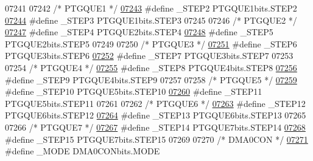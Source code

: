 \begin{DoxyCode}
07241 
07242 \textcolor{comment}{/* PTGQUE1 */}
\hypertarget{a00015_source_l07243}{}\hyperlink{a00015_ab7a038de94f59ad711958205c6e9a802}{07243} \textcolor{preprocessor}{#define \_STEP2 PTGQUE1bits.STEP2}
\hypertarget{a00015_source_l07244}{}\hyperlink{a00015_aa905cce9d90af5accde9b581065fcd9b}{07244} \textcolor{preprocessor}{#define \_STEP3 PTGQUE1bits.STEP3}
07245 
07246 \textcolor{comment}{/* PTGQUE2 */}
\hypertarget{a00015_source_l07247}{}\hyperlink{a00015_acb9583d0b0ccc8b7f1cb05f77205b915}{07247} \textcolor{preprocessor}{#define \_STEP4 PTGQUE2bits.STEP4}
\hypertarget{a00015_source_l07248}{}\hyperlink{a00015_a0d9d2c77a3255e72af295a4bf2dd64ba}{07248} \textcolor{preprocessor}{#define \_STEP5 PTGQUE2bits.STEP5}
07249 
07250 \textcolor{comment}{/* PTGQUE3 */}
\hypertarget{a00015_source_l07251}{}\hyperlink{a00015_a60c17842bb1a2939fb85cbc567247543}{07251} \textcolor{preprocessor}{#define \_STEP6 PTGQUE3bits.STEP6}
\hypertarget{a00015_source_l07252}{}\hyperlink{a00015_a5fae31d50ad75e8e2c87ec2063e0efc2}{07252} \textcolor{preprocessor}{#define \_STEP7 PTGQUE3bits.STEP7}
07253 
07254 \textcolor{comment}{/* PTGQUE4 */}
\hypertarget{a00015_source_l07255}{}\hyperlink{a00015_a7b120a582184254b0ada22d9cb5e9aca}{07255} \textcolor{preprocessor}{#define \_STEP8 PTGQUE4bits.STEP8}
\hypertarget{a00015_source_l07256}{}\hyperlink{a00015_a26e236085a7aba41176efa04dbfd2bdb}{07256} \textcolor{preprocessor}{#define \_STEP9 PTGQUE4bits.STEP9}
07257 
07258 \textcolor{comment}{/* PTGQUE5 */}
\hypertarget{a00015_source_l07259}{}\hyperlink{a00015_a44501756b31d4b84ffb1e84e6c78ed77}{07259} \textcolor{preprocessor}{#define \_STEP10 PTGQUE5bits.STEP10}
\hypertarget{a00015_source_l07260}{}\hyperlink{a00015_a3ded52fe347b337ea54904ba0a4fa695}{07260} \textcolor{preprocessor}{#define \_STEP11 PTGQUE5bits.STEP11}
07261 
07262 \textcolor{comment}{/* PTGQUE6 */}
\hypertarget{a00015_source_l07263}{}\hyperlink{a00015_a876b48df506e436af53df7844f5b9517}{07263} \textcolor{preprocessor}{#define \_STEP12 PTGQUE6bits.STEP12}
\hypertarget{a00015_source_l07264}{}\hyperlink{a00015_aedf63b0bd35e358513bf8f204ad38411}{07264} \textcolor{preprocessor}{#define \_STEP13 PTGQUE6bits.STEP13}
07265 
07266 \textcolor{comment}{/* PTGQUE7 */}
\hypertarget{a00015_source_l07267}{}\hyperlink{a00015_aa077f76695912abe8ec9a710d72f0b6e}{07267} \textcolor{preprocessor}{#define \_STEP14 PTGQUE7bits.STEP14}
\hypertarget{a00015_source_l07268}{}\hyperlink{a00015_ac8e8bafb4db0d451ab06a7caf8ed29f1}{07268} \textcolor{preprocessor}{#define \_STEP15 PTGQUE7bits.STEP15}
07269 
07270 \textcolor{comment}{/* DMA0CON */}
\hypertarget{a00015_source_l07271}{}\hyperlink{a00015_a37a6b31e7f35f6eacbc56a606040fc29}{07271} \textcolor{preprocessor}{#define \_MODE DMA0CONbits.MODE}

\end{DoxyCode}
